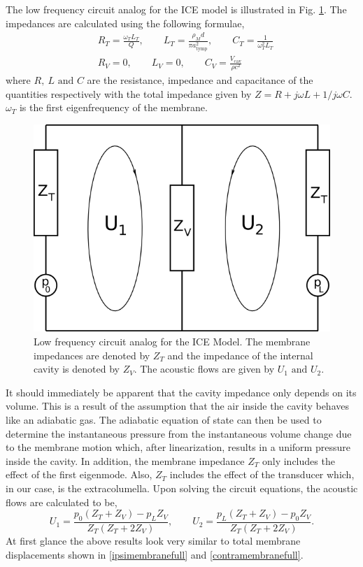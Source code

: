 The low frequency circuit analog for the ICE model is illustrated in Fig. \ref{lowfreqcircuit}. The impedances are calculated
using the following formulae,
\begin{align}
 &R_T=\frac{\omega_TL_T}{Q},\qquad L_T=\frac{\rho_Md}{\pi a_{\mathrm{tymp}}^2},\qquad C_T=\frac{1}{\omega^2_TL_T}\\
 &R_V=0,\qquad L_V=0,\qquad C_V=\frac{V_{\mathrm{cav}}}{\rho c^2}
\end{align}
where $R,\ L\mbox{ and }C$ are the resistance, impedance and capacitance of the quantities respectively with the total impedance
given by $Z=R+j\omega L+1/j\omega C$. $\omega_T$ is the first eigenfrequency of the membrane.
\begin{figure}[ht!]
 \centering
 \includegraphics[width=.5\linewidth]{Diagrams/lowfreqcircuit.png}
 \caption[Low frequency circuit analog]{Low frequency circuit analog for the ICE Model. The membrane impedances are denoted by $Z_T$ and the impedance of 
 the internal cavity is denoted by $Z_V$. The acoustic flows are given by $U_1\mbox{ and }U_2$.}
  \label{lowfreqcircuit}
\end{figure}
It should immediately be apparent that the cavity impedance only depends on its volume. This is a result of the assumption 
that the air inside the cavity behaves like an adiabatic gas. The adiabatic equation of state can then be used
to determine the instantaneous pressure from the instantaneous volume change due to the membrane
motion which, after linearization, results in a uniform pressure inside the cavity. In addition, the membrane impedance $Z_T$ only includes the
effect of the first eigenmode. Also, $Z_T$ includes the effect of the transducer which, in our case, is the extracolumella. Upon solving the circuit equations, the acoustic flows are calculated to be,
\begin{equation}
 U_1=\frac{p_0(Z_T+Z_V)-p_LZ_V}{Z_T(Z_T+2Z_V)},\qquad U_2=\frac{p_L(Z_T+Z_V)-p_0Z_V}{Z_T(Z_T+2Z_V)}.
\end{equation}
At first glance the above results look very similar to total membrane displacements shown in \eqref{ipsimembranefull} and \eqref{contramembranefull}.
